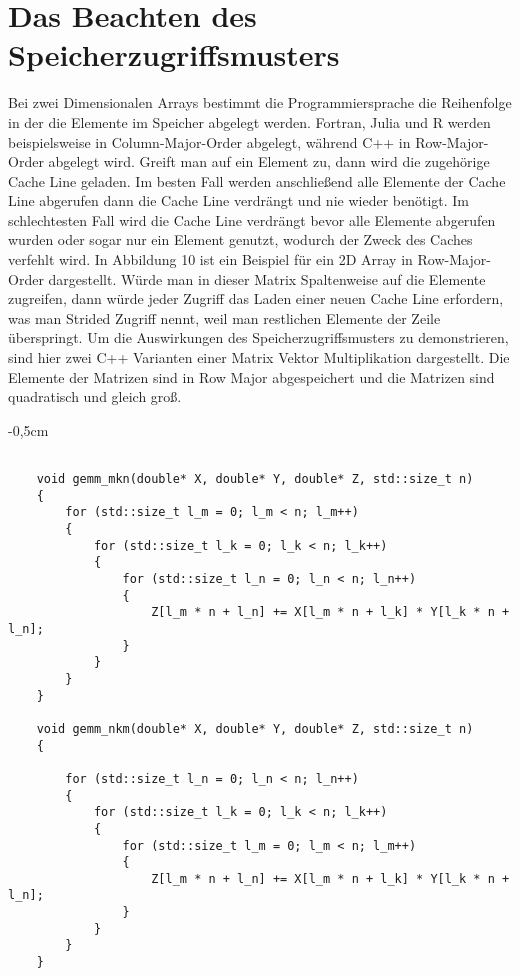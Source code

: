 \documentclass[sigconf,language=english]{acmart}
\begin{document}
\section{Das Beachten des Speicherzugriffsmusters}
    Bei zwei Dimensionalen Arrays bestimmt die Programmiersprache die Reihenfolge 
    in der die Elemente im Speicher abgelegt werden. Fortran, Julia und R werden beispielsweise
    in Column-Major-Order abgelegt, während C++ in Row-Major-Order abgelegt wird.
    Greift man auf ein Element zu, dann wird die zugehörige Cache Line geladen.
    Im besten Fall werden anschließend alle Elemente der Cache Line abgerufen dann die Cache Line verdrängt 
    und nie wieder benötigt. Im schlechtesten Fall wird die Cache Line verdrängt bevor alle Elemente abgerufen wurden 
    oder sogar nur ein Element genutzt, wodurch der Zweck des Caches verfehlt wird.
    In Abbildung 10 ist ein Beispiel für ein 2D Array in Row-Major-Order dargestellt. %
    Würde man in dieser Matrix Spaltenweise auf die Elemente zugreifen,
    dann würde jeder Zugriff das Laden einer neuen Cache Line erfordern, was man Strided Zugriff nennt, 
    weil man restlichen Elemente der Zeile überspringt.
    Um die Auswirkungen des Speicherzugriffsmusters zu demonstrieren, sind hier zwei C++ 
    Varianten einer Matrix Vektor Multiplikation dargestellt. Die Elemente der Matrizen sind 
    in Row Major abgespeichert und die Matrizen sind quadratisch und gleich groß.
    
    \begin{adjustwidth}{-0,5cm}{}
    \begin{footnotesize}
    \begin{verbatim}

    void gemm_mkn(double* X, double* Y, double* Z, std::size_t n)
    {
        for (std::size_t l_m = 0; l_m < n; l_m++)
        {
            for (std::size_t l_k = 0; l_k < n; l_k++)
            {
                for (std::size_t l_n = 0; l_n < n; l_n++)
                {
                    Z[l_m * n + l_n] += X[l_m * n + l_k] * Y[l_k * n + l_n];
                }
            }
        }
    }
    
    void gemm_nkm(double* X, double* Y, double* Z, std::size_t n)
    {
    
        for (std::size_t l_n = 0; l_n < n; l_n++)
        {
            for (std::size_t l_k = 0; l_k < n; l_k++)
            {
                for (std::size_t l_m = 0; l_m < n; l_m++)
                {
                    Z[l_m * n + l_n] += X[l_m * n + l_k] * Y[l_k * n + l_n];
                }
            }
        }
    }
    \end{verbatim}
    \end{footnotesize}
    \end{adjustwidth}
\end{document}
